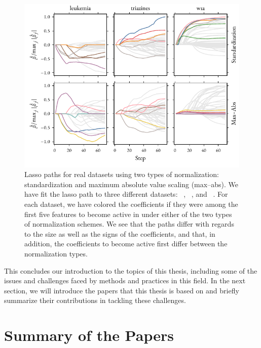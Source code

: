 \begin{figure}[htpb]
  \centering
  \includegraphics[]{figures/realdata_paths.pdf}
  \caption{%
    Lasso paths for real datasets using two types of normalization: standardization and maximum absolute value scaling (max--abs). We have fit the lasso path to three different datasets: ~\parencite{golub1999}, ~\parencite{king}, and ~\parencite{platt1998}. For each dataset, we have colored the coefficients if they were among the first five features to become active in under either of the two types of normalization schemes. We see that the paths differ with regards to the size as well as the signs of the coefficients, and that, in addition, the coefficients to become active first differ between the normalization types.
  }
  \label{fig:normalized-realdata-lasso-paths}
\end{figure}

This concludes our introduction to the topics of this thesis, including some of the issues and challenges faced by methods and practices in this field. In the next section, we will introduce the papers that this thesis is based on and briefly summarize their contributions in tackling these challenges.

\section{Summary of the Papers}


